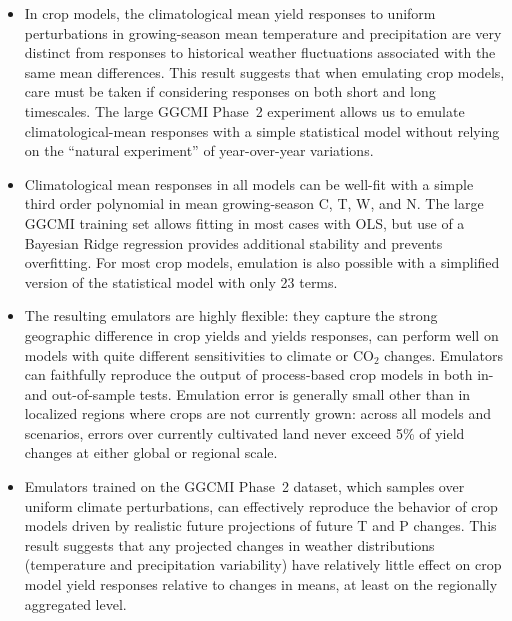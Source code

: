 \documentclass[gmdd]{copernicus} %
\begin{document}
\begin{itemize}
    \item In crop models, the climatological mean yield responses to uniform perturbations in growing-season mean temperature and precipitation are very distinct from responses to historical weather fluctuations associated with the same mean differences. This result suggests that when emulating crop models, care must be taken if considering responses on both short and long timescales. The large GGCMI Phase~2 experiment allows us to emulate climatological-mean responses with a simple statistical model without relying on the ``natural experiment'' of year-over-year variations. 
    \item Climatological mean responses in all models can be well-fit with a simple third order polynomial in mean growing-season C, T, W, and N. The large GGCMI training set allows fitting in most cases with OLS, but use of a Bayesian Ridge regression provides additional stability and prevents overfitting. For most crop models, emulation is also possible with a simplified version of the statistical model with only 23 terms.
    \item The resulting emulators are highly flexible: they capture the strong geographic difference in crop yields and yields responses, can perform well on models with quite different sensitivities to climate or CO$_2$ changes. Emulators can faithfully reproduce the output of process-based crop models in both in- and out-of-sample tests. Emulation error is  
    generally small other than in localized regions where crops are not currently grown: across all models and scenarios, errors over currently cultivated land never exceed 5\% of yield changes at either global or regional scale.  

    \item Emulators trained on the GGCMI Phase~2 dataset, which samples over uniform climate perturbations, can effectively reproduce the behavior of crop models driven by realistic future projections of future T and P changes. This result suggests that any projected changes in weather distributions (temperature and precipitation variability) have relatively little effect on crop model yield responses relative to changes in means, at least on the regionally aggregated level. %


\end{itemize}
\end{document}
